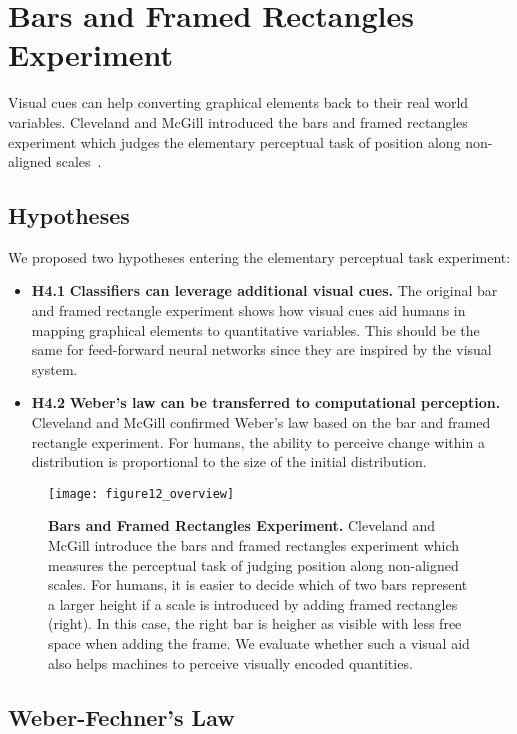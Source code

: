 \section{Bars and Framed Rectangles Experiment}

Visual cues can help converting graphical elements back to their real world variables. Cleveland and McGill introduced the bars and framed rectangles experiment which judges the elementary perceptual task of position along non-aligned scales~\cite{cleveland_mcgill}. 

\subsection{Hypotheses}

We proposed two hypotheses entering the elementary perceptual task experiment:

\begin{itemize}
	\item \textbf{H4.1} \textbf{Classifiers can leverage additional visual cues.} The original bar and framed rectangle experiment shows how visual cues aid humans in mapping graphical elements to quantitative variables. This should be the same for feed-forward neural networks since they are inspired by the visual system.
	\item \textbf{H4.2} \textbf{Weber's law can be transferred to computational perception.} Cleveland and McGill confirmed Weber's law based on the bar and framed rectangle experiment. For humans, the ability to perceive change within a distribution is proportional to the size of the initial distribution.
\end{itemize}

\begin{figure}[t]
	  \texttt{[image: figure12\_overview]}
  \caption{\textbf{Bars and Framed Rectangles Experiment.} Cleveland and McGill introduce the bars and framed rectangles experiment which measures the perceptual task of judging position along non-aligned scales. For humans, it is easier to decide which of two bars represent a larger height if a scale is introduced by adding framed rectangles (right). In this case, the right bar is heigher as visible with less free space when adding the frame. We evaluate whether such a visual aid also helps machines to perceive visually encoded quantities.}
	\label{fig:bars_and_framed_rectangles_experiment}
\end{figure}

\subsection{Weber-Fechner's Law}

